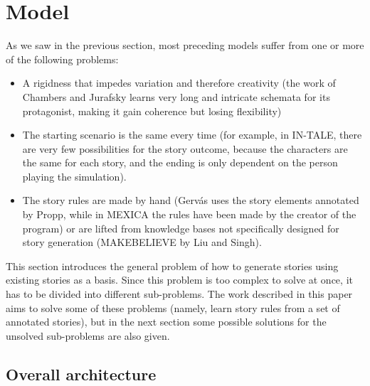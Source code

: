 \section{Model}

As we saw in the previous section, most preceding models suffer from one or more
of the following problems:
\begin{itemize}
	\item A rigidness that impedes variation and therefore creativity (the work
	of Chambers and Jurafsky learns very long and intricate schemata for its
	protagonist, making it gain coherence but losing flexibility)
	\item The starting scenario is the same every time (for
	example, in IN-TALE, there are very few possibilities for the story outcome,
	because the characters are the same for each story, and the ending is only
	dependent on the person playing the simulation).
	\item The story rules are made by hand (Gervás uses the story elements annotated
	by Propp, while in MEXICA the rules have been made by the creator of the
	program) or are lifted from knowledge bases not specifically designed for
	story generation (MAKEBELIEVE by Liu and Singh).
\end{itemize}
This section introduces the general problem of how to generate stories using
existing stories as a basis. Since
this problem is too complex to solve at once, it has to be divided into different sub-problems.
The work described in this paper aims to solve some of these problems (namely,
learn story rules from a set of annotated stories), but in
the next section some possible solutions for the unsolved sub-problems are also
given.

\subsection{Overall architecture}

